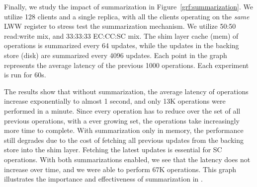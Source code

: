 Finally, we study the impact of summarization in
Figure~\ref{grf:summarization}. We utilize 128 clients and a single \name
replica, with all the clients operating on the \emph{same} LWW register to
stress test the summarization mechanism. We utilize 50:50 read:write mix, and
33:33:33 EC:CC:SC mix. The shim layer cache (mem) of operations is summarized
every 64 updates, while the updates in the backing store (disk) are summarized
every 4096 updates. Each point in the graph represents the average latency of
the previous 1000 operations. Each experiment is run for 60s.

The results show that without summarization, the average latency of operations
increase exponentially to almost 1 second, and only 13K operations were
performed in a minute. Since every operation has to reduce over the set of all
previous operations, with a ever growing set, the operations take increasingly
more time to complete. With summarization only in memory, the performance still
degrades due to the cost of fetching all previous updates from the backing
store into the shim layer. Fetching the latest updates is essential for SC
operations. With both summarizations enabled, we see that the latency does not
increase over time, and we were able to perform 67K operations. This graph
illustrates the importance and effectiveness of summarization in \name.
